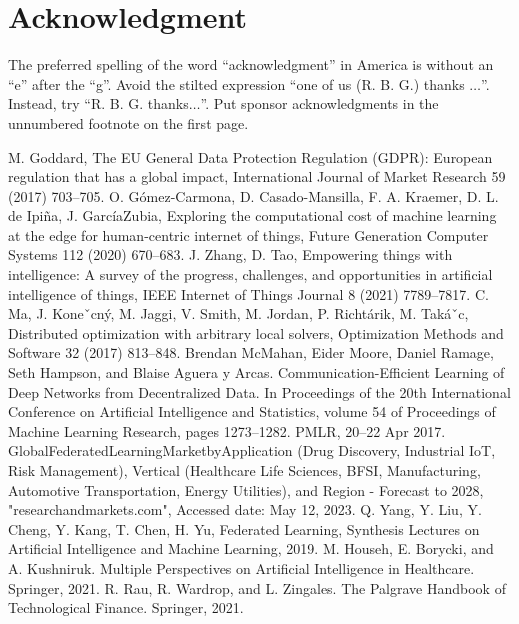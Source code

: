 \documentclass[conference]{IEEEtran}
\begin{document}
\section*{Acknowledgment}

The preferred spelling of the word ``acknowledgment'' in America is without
an ``e'' after the ``g''. Avoid the stilted expression ``one of us (R. B.
G.) thanks $\ldots$''. Instead, try ``R. B. G. thanks$\ldots$''. Put sponsor
acknowledgments in the unnumbered footnote on the first page.



\begin{thebibliography}{00}
     M. Goddard, The EU General Data Protection Regulation (GDPR): European regulation that has a global impact, International Journal of Market Research 59 (2017) 703–705.
     O. Gómez-Carmona, D. Casado-Mansilla, F. A. Kraemer, D. L. de Ipiña, J. GarcíaZubia, Exploring the computational cost of machine learning at the edge for human-centric internet of things, Future Generation Computer Systems 112 (2020) 670–683.
     J. Zhang, D. Tao, Empowering things with intelligence: A survey of the progress, challenges, and opportunities in artificial intelligence of things, IEEE Internet of Things Journal 8 (2021) 7789–7817.
     C. Ma, J. Koneˇcný, M. Jaggi, V. Smith, M. Jordan, P. Richtárik, M. Takáˇc, Distributed optimization with arbitrary local solvers, Optimization Methods and Software 32 (2017) 813–848.
     Brendan McMahan, Eider Moore, Daniel Ramage, Seth Hampson, and Blaise Aguera y Arcas. Communication-Efficient Learning of Deep Networks from Decentralized Data. In Proceedings of the 20th International Conference on Artificial Intelligence and Statistics, volume 54 of Proceedings of Machine Learning Research, pages 1273–1282. PMLR, 20–22 Apr 2017.
     GlobalFederatedLearningMarketbyApplication (Drug Discovery, Industrial IoT, Risk Management), Vertical (Healthcare  Life Sciences, BFSI, Manufacturing, Automotive Transportation, Energy  Utilities), and Region - Forecast to 2028, "researchandmarkets.com", Accessed date: May 12, 2023.
     Q. Yang, Y. Liu, Y. Cheng, Y. Kang, T. Chen, H. Yu, Federated Learning, Synthesis Lectures on Artificial Intelligence and Machine Learning, 2019.
     M. Househ, E. Borycki, and A. Kushniruk. Multiple Perspectives on Artificial Intelligence in Healthcare. Springer, 2021.
     R. Rau, R. Wardrop, and L. Zingales. The Palgrave Handbook of Technological Finance. Springer, 2021.

\end{thebibliography}
\end{document}

